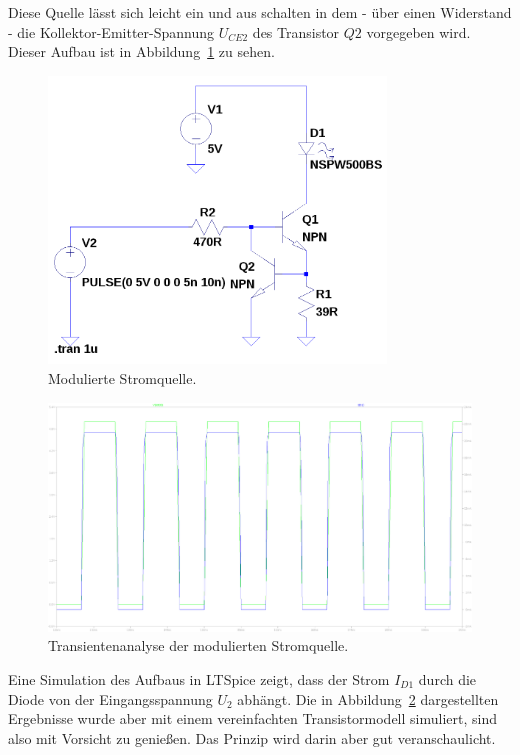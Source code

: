 \documentclass[12pt,a4paper]{article}
\begin{document}
Diese Quelle lässt sich leicht ein und aus schalten in dem - über einen Widerstand - die Kollektor-Emitter-Spannung $U_{CE2}$ des Transistor $Q2$ vorgegeben wird. Dieser Aufbau ist in Abbildung~\ref{fig:modulated_current_source} zu sehen.

\begin{figure}[h!]
  \centering
    \includegraphics[width=0.8\textwidth]{../spice/modulated_current_source.png}
  \caption{Modulierte Stromquelle.}
  \label{fig:modulated_current_source}
\end{figure}

\begin{figure}[h!]
  \centering
    \includegraphics[width=1.0\textwidth]{../spice/current_input_v_current_out_trans.png}
  \caption{Transientenanalyse der modulierten Stromquelle.}
  \label{fig:modulated_current_source_plot}
\end{figure}


Eine Simulation des Aufbaus in LTSpice zeigt, dass der Strom $I_{D1}$ durch die Diode von der Eingangsspannung $U_2$ abhängt. Die in Abbildung~\ref{fig:modulated_current_source_plot} dargestellten Ergebnisse wurde aber mit einem vereinfachten Transistormodell simuliert, sind also mit Vorsicht zu genießen. Das Prinzip wird darin aber gut veranschaulicht.
\end{document}
